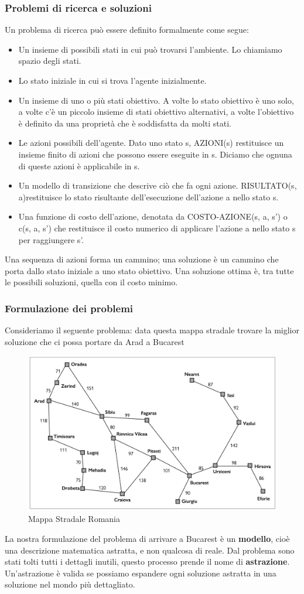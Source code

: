 \documentclass{article}
\begin{document}
\subsubsection{Problemi di ricerca e soluzioni}
Un problema di ricerca può essere definito formalmente come segue:
\begin{itemize}
    \item Un insieme di possibili stati in cui può trovarsi l'ambiente. Lo chiamiamo spazio degli stati.
	\item Lo stato iniziale in cui si trova l'agente inizialmente.
	\item Un insieme di uno o più stati obiettivo. A volte lo stato obiettivo è uno solo, a volte c'è un piccolo insieme di stati obiettivo alternativi, a volte l'obiettivo è definito da una proprietà che è soddisfatta da molti stati.
	\item Le azioni possibili dell'agente. Dato uno stato s, AZIONI(s) restituisce un insieme finito di azioni che possono essere eseguite in s. Diciamo che ognuna di queste azioni è applicabile in s.
	\item Un modello di transizione che descrive ciò che fa ogni azione. RISULTATO(s, a)restituisce lo stato risultante dell'esecuzione dell'azione a nello stato s.
	\item Una funzione di costo dell'azione, denotata da COSTO-AZIONE(s, a, s') o c(s, a, s') che restituisce il costo numerico di applicare l'azione a nello stato s per raggiungere s'.
\end{itemize}
Una sequenza di azioni forma un cammino; una soluzione è un cammino che porta dallo stato iniziale a uno stato obiettivo. Una soluzione ottima è, tra tutte le possibili soluzioni, quella con il costo minimo.
\newpage
\subsubsection{Formulazione dei problemi}
Consideriamo il seguente problema: data questa mappa stradale trovare la miglior soluzione che ci possa portare da Arad a Bucarest
\begin{figure}[H]
    \centering
    \includegraphics[width=0.5\linewidth]{Images/MappaStradaleRomania.png}
    \caption{Mappa Stradale Romania}
    \label{fig:enter-label}
\end{figure}
\noindent La nostra formulazione del problema di arrivare a Bucarest è un \textbf{modello}, cioè una descrizione matematica astratta, e non qualcosa di reale. Dal problema sono stati tolti tutti i dettagli inutili, questo processo prende il nome di \textbf{astrazione}. Un'astrazione è valida se possiamo espandere ogni soluzione astratta in una soluzione nel mondo più dettagliato.\newline
\end{document}
